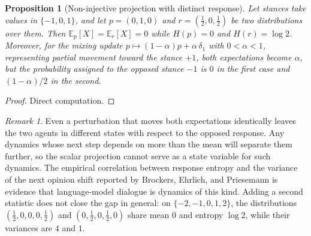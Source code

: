 \documentclass[11pt]{article}
\newtheorem{proposition}{Proposition}
\theoremstyle{definition}
\theoremstyle{remark}
\newtheorem*{remark}{Remark}
\newcommand{\E}{\mathbb{E}}
\begin{document}
\begin{proposition}[Non-injective projection with distinct response]\label{prop:proj}
Let stances take values in $\{-1, 0, 1\}$, and let $p = (0, 1, 0)$ and $r = (\tfrac12, 0, \tfrac12)$ be two distributions over them. Then $\E_p[X] = \E_r[X] = 0$ while $H(p) = 0$ and $H(r) = \log 2$. Moreover, for the mixing update $p \mapsto (1-\alpha)p + \alpha\,\delta_{1}$ with $0 < \alpha < 1$, representing partial movement toward the stance $+1$, both expectations become $\alpha$, but the probability assigned to the opposed stance $-1$ is $0$ in the first case and $(1-\alpha)/2$ in the second.
\end{proposition}
\begin{proof}
Direct computation.
\end{proof}
\begin{remark}
Even a perturbation that moves both expectations identically leaves the two agents in different states with respect to the opposed response. Any dynamics whose next step depends on more than the mean will separate them further, so the scalar projection cannot serve as a state variable for such dynamics. The empirical correlation between response entropy and the variance of the next opinion shift reported by Brockers, Ehrlich, and Priesemann is evidence that language-model dialogue is dynamics of this kind. Adding a second statistic does not close the gap in general: on $\{-2,-1,0,1,2\}$, the distributions $(\tfrac12,0,0,0,\tfrac12)$ and $(0,\tfrac12,0,\tfrac12,0)$ share mean $0$ and entropy $\log 2$, while their variances are $4$ and $1$.
\end{remark}
\end{document}
